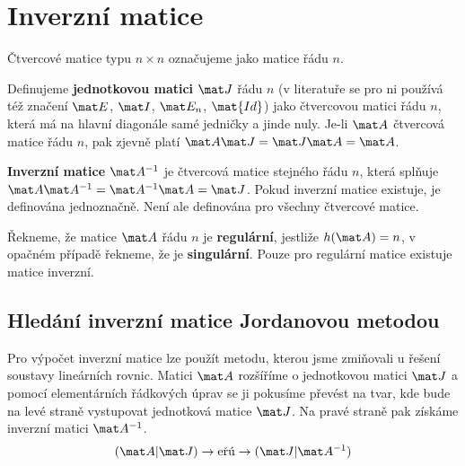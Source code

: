 \section*{Inverzní matice}

Čtvercové matice typu $n \times n$ označujeme jako matice řádu $n$.

Definujeme \textbf{jednotkovou matici} $\mat J$ řádu $n$ (v literatuře se pro ni používá též značení $\mat E$, $\mat I$, $\mat E_n$, $\mat{Id}$) jako čtvercovou matici řádu $n$, která má na hlavní diagonále samé jedničky a jinde nuly. Je-li $\mat A$ čtvercová matice řádu $n$, pak zjevně platí $\mat A \mat J = \mat J \mat A = \mat A$.

\textbf{Inverzní matice} $\mat A^{-1}$ je čtvercová matice stejného řádu $n$, která splňuje $\mat A \mat A^{-1} = \mat A^{-1} \mat A = \mat J$. Pokud inverzní matice existuje, je definována jednoznačně. Není ale definována pro všechny čtvercové matice. 

Řekneme, že matice $\mat A$ řádu $n$ je \textbf{regulární}, jestliže $h(\mat A) = n$, v opačném případě řekneme, že je \textbf{singulární}. Pouze pro regulární matice existuje matice inverzní.

\subsection*{Hledání inverzní matice Jordanovou metodou}

Pro výpočet inverzní matice lze použít metodu, kterou jsme zmiňovali u řešení soustavy lineárních rovnic. Matici $\mat A$ rozšíříme o jednotkovou matici $\mat J$ a pomocí elementárních řádkových úprav se ji pokusíme převést na tvar, kde bude na levé straně vystupovat jednotková matice $\mat J$. Na pravé straně pak získáme inverzní matici $\mat A^{-1}$.
\begin{align}
    (\mat A | \mat J) \rightarrow \text{eřú} \rightarrow (\mat J | \mat A^{-1})
\end{align}

